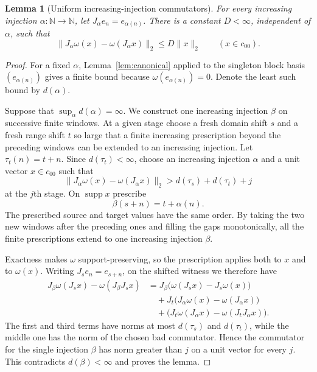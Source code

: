 \documentclass[11pt]{article}
\newtheorem{lemma}[theorem]{Lemma}
\newcommand{\czz}{c_{00}}
\newcommand{\supp}{\operatorname{supp}}
\begin{document}
\begin{lemma}[Uniform increasing-injection commutators]
\label{lem:uniform-injections}
For every increasing injection $\alpha:\mathbb N\to\mathbb N$, let
$J_\alpha e_n=e_{\alpha(n)}$.  There is a constant $D<\infty$, independent of
$\alpha$, such that
\begin{equation}\label{eq:uniform-injections}
 \|J_\alpha\omega(x)-\omega(J_\alpha x)\|_2
 \le D\|x\|_2 \qquad(x\in\czz).
\end{equation}
\end{lemma}

\begin{proof}
For a fixed $\alpha$, Lemma~\ref{lem:canonical} applied to the singleton
block basis $(e_{\alpha(n)})$ gives a finite bound because
$\omega(e_{\alpha(n)})=0$.  Denote the least such bound by $d(\alpha)$.

Suppose that $\sup_\alpha d(\alpha)=\infty$.  We construct one increasing
injection $\beta$ on successive finite windows.  At a given stage choose a
fresh domain shift $s$ and a fresh range shift $t$ so large that a finite
increasing prescription beyond the preceding windows can be extended to an
increasing injection.  Let $\tau_t(n)=t+n$.  Since $d(\tau_t)<\infty$, choose
an increasing injection $\alpha$ and a unit vector $x\in\czz$ such that
\[
  \|J_\alpha\omega(x)-\omega(J_\alpha x)\|_2
   >d(\tau_s)+d(\tau_t)+j
\]
at the $j$th stage.  On $\supp x$ prescribe
\[
 \beta(s+n)=t+\alpha(n).
\]
The prescribed source and target values have the same order.  By taking the
two new windows after the preceding ones and filling the gaps monotonically,
all the finite prescriptions extend to one increasing injection $\beta$.

Exactness makes $\omega$ support-preserving, so the prescription applies both
to $x$ and to $\omega(x)$.  Writing $J_s e_n=e_{s+n}$, on the shifted witness
we therefore have
\begin{align*}
 J_\beta\omega(J_sx)-\omega(J_\beta J_sx)
 &=J_\beta\big(\omega(J_sx)-J_s\omega(x)\big)\\
 &\quad+J_t\big(J_\alpha\omega(x)-\omega(J_\alpha x)\big)\\
 &\quad+\big(J_t\omega(J_\alpha x)-
                  \omega(J_tJ_\alpha x)\big).
\end{align*}
The first and third terms have norms at most $d(\tau_s)$ and $d(\tau_t)$,
while the middle one has the norm of the chosen bad commutator.  Hence the
commutator for the single injection $\beta$ has norm greater than $j$ on a
unit vector for every $j$.  This
contradicts $d(\beta)<\infty$ and proves the lemma.
\end{proof}
\end{document}
